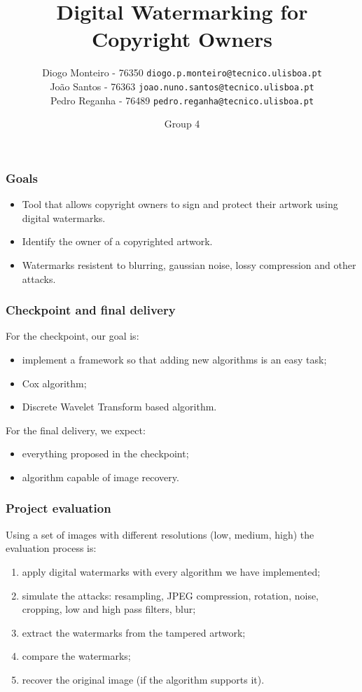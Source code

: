 \documentclass{beamer}
\begin{document}
	\begin{frame}
		\title{Digital Watermarking for Copyright Owners}
	\author{
	    Diogo Monteiro - 76350 \texttt{diogo.p.monteiro@tecnico.ulisboa.pt} \\
	    João Santos - 76363 \texttt{joao.nuno.santos@tecnico.ulisboa.pt} \\
	    Pedro Reganha - 76489 \texttt{pedro.reganha@tecnico.ulisboa.pt} \\
	}
	\date{Group 4}
		\maketitle
	\end{frame}
  \begin{frame}
    \frametitle{Goals}
    \begin{itemize}
    	\item Tool that allows copyright owners to sign and protect their artwork using digital watermarks.
    	\item Identify the owner of a copyrighted artwork.
    	\item Watermarks resistent to blurring, gaussian noise, lossy compression and other attacks.
    \end{itemize}
  \end{frame}
  \begin{frame}
    \frametitle{Checkpoint and final delivery}
    For the checkpoint, our goal is:

    \begin{itemize}
        \item implement a framework so that adding new algorithms is an easy task;
        \item Cox algorithm;
        \item Discrete Wavelet Transform based algorithm.
    \end{itemize}
    
For the final delivery, we expect:
    \begin{itemize}
        \item everything proposed in the checkpoint;
        \item algorithm capable of image recovery.
    \end{itemize}
  \end{frame}

  \begin{frame}
  \frametitle{Project evaluation}
  	Using a set of images with different resolutions (low, medium, high) the evaluation process is: 
    \begin{enumerate}
        \item apply digital watermarks with every algorithm we have implemented;
        \item simulate the attacks: resampling, JPEG compression, rotation, noise, cropping, low and high pass filters, blur;
        \item extract the watermarks from the tampered artwork;
        \item compare the watermarks;
        \item recover the original image (if the algorithm supports it).
    \end{enumerate}
  \end{frame}
\end{document}
